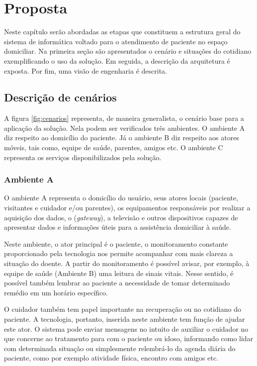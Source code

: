 \chapter{Proposta}\label{cap:quatro}

Neste capítulo serão abordadas as etapas que constituem a estrutura geral do
sistema de informática voltado para o atendimento de paciente no espaço domiciliar. 
Na primeira seção são apresentados o cenário e situações do cotidiano exemplificando
o uso da solução. Em seguida, a descrição da arquitetura é exposta. Por fim, uma
visão de engenharia é descrita.

\section{Descrição de cenários}

A figura \ref{fig:cenarios} representa, de maneira generalista, o cenário base
para a aplicação da solução. Nela podem ser verificados três ambientes. O
ambiente A diz respeito ao domicílio do paciente. Já o ambiente B diz respeito
aos atores móveis, tais como, equipe de saúde, parentes, amigos etc. O ambiente
C representa os serviços disponibilizados pela solução.


\subsection{Ambiente A} \label{subsec:ambiente-a}

O ambiente A representa o domicílio do usuário, seus atores locais (paciente,
visitantes e cuidador e/ou parentes), os equipamentos responsáveis por  realizar
a aquisição dos dados, o \stb[] (\textit{gateway}), a televisão e outros
dispositivos capazes de apresentar dados e informações úteis para a assistência
domiciliar à saúde.

Neste ambiente, o ator principal é o paciente, o monitoramento constante 
proporcionado pela tecnologia nos permite acompanhar com mais clareza a situação
do doente. A partir do monitoramento é possível avisar, por exemplo, à equipe
de saúde (Ambiente B) uma leitura de sinais vitais. Nesse sentido, é possível 
também lembrar ao paciente a necessidade de tomar determinado remédio em um
horário específico.

O cuidador também tem papel importante na recuperação ou no cotidiano do 
paciente. A tecnologia, portanto, inserida neste ambiente tem função de ajudar
este ator. O sistema pode enviar mensagens no intuito de auxiliar o cuidador no
que concerne ao tratamento para com o paciente ou idoso, informando como lidar
com determinada situação ou simplesmente relembrá-lo da agenda diária do 
paciente, como por exemplo atividade física, encontro com amigos etc.

